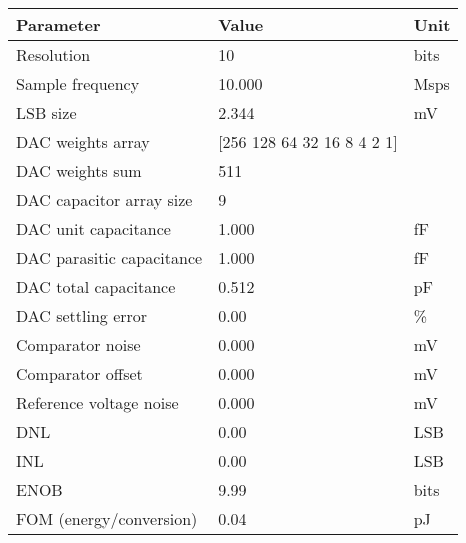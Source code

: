 \begin{tabular}{lll}
\toprule
Parameter & Value & Unit \\
\midrule
Resolution & 10 & bits \\
Sample frequency & 10.000 & Msps \\
LSB size & 2.344 & mV \\
DAC weights array & [256 128  64  32  16   8   4   2   1] &  \\
DAC weights sum & 511 &  \\
DAC capacitor array size & 9 &  \\
DAC unit capacitance & 1.000 & fF \\
DAC parasitic capacitance & 1.000 & fF \\
DAC total capacitance & 0.512 & pF \\
DAC settling error & 0.00 & \% \\
Comparator noise & 0.000 & mV \\
Comparator offset & 0.000 & mV \\
Reference voltage noise & 0.000 & mV \\
DNL & 0.00 & LSB \\
INL & 0.00 & LSB \\
ENOB & 9.99 & bits \\
FOM (energy/conversion) & 0.04 & pJ \\
\bottomrule
\end{tabular}

